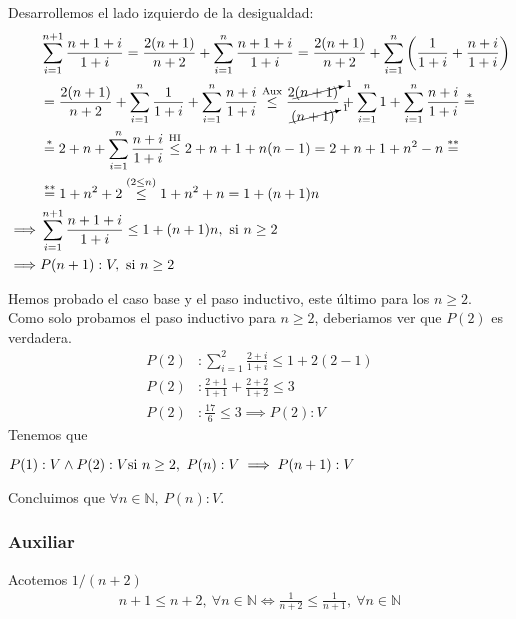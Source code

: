 \begin{enumerate}[label=\roman*)]
\begin{enumerate}[label=\arabic*)]
        Desarrollemos el lado izquierdo de la desigualdad:
        \begin{align*}
            &\sum_{i=1}^{n+1} \frac{n+1+i}{1+i} = \frac{2(n+1)}{n+2} + \sum_{i=1}^{n} \frac{n+1+i}{1+i} 
            = \frac{2(n+1)}{n+2} + \sum_{i=1}^{n} \left(\frac{1}{1+i} + \frac{n+i}{1+i} \right) \\
            &= \frac{2(n+1)}{n+2} + \sum_{i=1}^{n} \frac{1}{1+i} + \sum_{i=1}^{n} \frac{n+i}{1+i} 
            \overset{\text{Aux}}{\leq} \frac{2\cancelto{1}{(n+1)}}{\cancelto{1}{(n+1)}} + \sum_{i=1}^{n} 1 
            + \sum_{i=1}^{n} \frac{n+i}{1+i} \overset{*}{=} \\
            &\overset{*}{=} 2 + n + \sum_{i=1}^{n} \frac{n+i}{1+i} \overset{\text{HI}}{\leq} 2 + n + 1 + n(n-1) 
            = 2 + n + 1 + n^2 - n \overset{**}{=}\\ 
            &\overset{**}{=} 1 + n^2 + 2 \overset{(2 \leq n)}{\leq} 1 + n^2 + n = 1 + (n+1)n \\
            \implies & \sum_{i=1}^{n+1} \frac{n+1+i}{1+i} \leq 1 + (n+1)n, \text{ si } n \geq 2 \\
            \implies & P(n+1): V,\text{ si } n \geq 2                                                                                    
        \end{align*}
    \end{enumerate}

    Hemos probado el caso base y el paso inductivo, este último para los $n \geq 2$. Como solo probamos el paso 
    inductivo para $n \geq 2$, deberiamos ver que $P(2)$ es verdadera.
    \begin{align*}
        P(2)&: \sum_{i=1}^{2} \frac{2+i}{1+i} \leq 1 + 2(2-1) \\
        P(2)&: \frac{2+1}{1+1} + \frac{2+2}{1+2} \leq 3 \\
        P(2)&: \frac{17}{6} \leq 3 \implies P(2): V
    \end{align*}
    Tenemos que

    $P(1): V \land P(2): V \\
    \text{si } n \geq 2, \ P(n): V \implies P(n+1): V$ 

    Concluimos que $\forall n \in \mathbb{N}, \ P(n): V$.

    \subsubsection*{Auxiliar}
    Acotemos $1/(n+2)$
    \begin{align*}
        n+1 \leq n + 2 , \ \forall n \in \mathbb{N} \Longleftrightarrow \frac{1}{n+2} \leq \frac{1}{n+1}, 
        \ \forall n \in \mathbb{N}
    \end{align*}


\end{enumerate}
